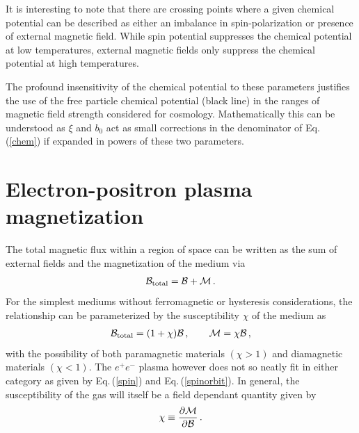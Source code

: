 \documentclass[aps,prd,floatfix,reprint]{revtex4-2}
\newcommand{\req}[1]{Eq.\,(\ref{#1})}
\begin{document}
It is interesting to note that there are crossing points where a given chemical potential can be described as either an imbalance in spin-polarization or presence of external magnetic field. While spin potential suppresses the chemical potential at low temperatures, external magnetic fields only suppress the chemical potential at high temperatures.

The profound insensitivity of the chemical potential to these parameters justifies the use of the free particle chemical potential (black line) in the ranges of magnetic field strength considered for cosmology. Mathematically this can be understood as $\xi$ and $b_{0}$ act as small corrections in the denominator of \req{chem} if expanded in powers of these two parameters.

\section{Electron-positron plasma magnetization}
\label{sec:magnetization}
\noindent The total magnetic flux within a region of space can be written as the sum of external fields and the magnetization of the medium via
\begin{align}
 \label{totalmag}
 {\cal B}_{\rm total} = {\cal B} + {\cal M}\,.
\end{align}
For the simplest mediums without ferromagnetic or hysteresis considerations, the relationship can be parameterized by the susceptibility $\chi$ of the medium as
\begin{align}
 \label{susceptibility}
 {\cal B}_{\rm total} = (1+\chi){\cal B}\,,\qquad {\cal M} = \chi{\cal B}\,,
\end{align}
with the possibility of both paramagnetic materials $(\chi>1)$ and diamagnetic materials $(\chi<1)$. The $e^{+}e^{-}$ plasma however does not so neatly fit in either category as given by \req{spin} and \req{spinorbit}. In general, the susceptibility of the gas will itself be a field dependant quantity given by
\begin{align}
    \chi \equiv \frac{\partial{\cal M}}{\partial{\cal B}}\,.
\end{align}
\end{document}
